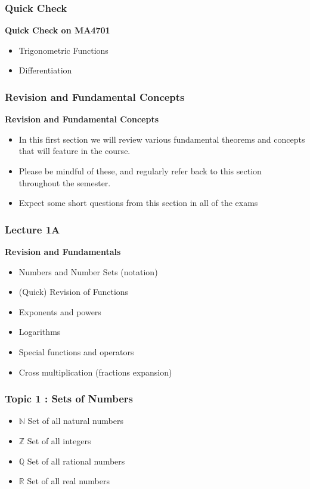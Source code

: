 \begin{itemize}
\begin{frame}
\frametitle{Quick Check}
\textbf{Quick Check on MA4701}
\begin{itemize}
\item Trigonometric Functions
\item Differentiation
\end{itemize}

\end{frame}


\begin{frame}
	\frametitle{Revision and Fundamental Concepts}
	\textbf{Revision and Fundamental Concepts}
	\begin{itemize}
		\item	In this first section we will review various fundamental theorems and concepts that
		will feature in the course.
		\item	Please be mindful of these, and regularly refer back to this section 
		throughout the semester.
		\item Expect some short questions from this section in all of the exams
	\end{itemize}
	
\end{frame}
\begin{frame}
	\frametitle{Lecture 1A}
	\textbf{Revision and Fundamentals}
	
	\begin{itemize}
		\item Numbers and Number Sets (notation)
		\item (Quick) Revision of Functions
		\item Exponents and powers
		\item Logarithms
		\item Special functions and operators
		\item Cross multiplication (fractions expansion)
	\end{itemize}
\end{frame}

\begin{frame}
	\frametitle{Topic 1 : Sets of Numbers}
	\begin{itemize} 
		\item $\mathbb{N}$ Set of all natural numbers
		\item $\mathbb{Z}$ Set of all integers
		\item $\mathbb{Q}$ Set of all rational numbers
		\item $\mathbb{R}$ Set of all real numbers
	\end{itemize}
	

\end{frame}
\end{itemize}
